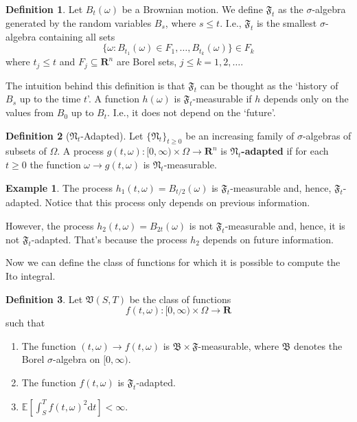 \documentclass[12pt,a4paper]{article}
\theoremstyle{definition}
\newtheorem{example}{Example}[section]
\newtheorem{definition}{Definition}[section]
\begin{document}
\begin{definition}
	Let $B_t(\omega)$ be a Brownian motion. We define $\mathfrak{F}_t$ as the $\sigma$-algebra generated by the random variables $B_s$, where $s \leq t$. I.e., $\mathfrak{F}_t$ is the smallest $\sigma$-algebra containing all sets
	\[
		\{ \omega : B_{t_1}(\omega) \in F_1, \ldots, B_{t_k}(\omega) \} \in F_k
	\]
	where $t_j \leq t$ and $F_j \subseteq \textbf{R}^n$ are Borel sets, $j \leq k = 1, 2, \ldots$.
\end{definition}

The intuition behind this definition is that $\mathfrak{F}_t$ can be thought as the `history of $B_s$ up to the time $t$'. A function $h(\omega)$ is $\mathfrak{F}_t$-measurable if $h$ depends only on the values from $B_0$ up to $B_t$. I.e., it does not depend on the `future'. 

\begin{definition}[$\mathfrak{N}_t$-Adapted]
	Let $\{ \mathfrak{N}_t \}_{t \geq 0}$ be an increasing family of $\sigma$-algebras of subsets of $\Omega$. A process $g(t,\omega) : [0, \infty) \times \Omega \longrightarrow \textbf{R}^n$ is \textbf{$\mathfrak{N}_t$-adapted} if for each $t \geq 0$ the function $\omega \longrightarrow g(t,\omega)$ is $\mathfrak{N}_t$-measurable.
\end{definition}

\begin{example}
	The process $h_1(t, \omega) = B_{t/2}(\omega)$ is $\mathfrak{F}_t$-measurable and, hence, $\mathfrak{F}_t$-adapted. Notice that this process only depends on previous information.
	
	However, the process $h_2(t, \omega) = B_{2t}(\omega)$ is not $\mathfrak{F}_t$-measurable and, hence, it is not $\mathfrak{F}_t$-adapted. That's because the process $h_2$ depends on future information.
\end{example}

%
%

Now we can define the class of functions for which it is possible to compute the Ito integral.

\begin{definition} \label{def:ito-integral}
	Let $\mathfrak{V}(S,T)$ be the class of functions
	\[
		f(t, \omega) : [0, \infty) \times \Omega \longrightarrow \textbf{R}
	\]
	such that
	\begin{enumerate}
		\item The function $(t, \omega) \longrightarrow f(t, \omega)$ is $\mathfrak{B} \times \mathfrak{F}$-measurable, where $\mathfrak{B}$ denotes the Borel $\sigma$-algebra on $[0, \infty)$.
		\item The function $f(t,\omega)$ is $\mathfrak{F}_t$-adapted.
		\item $\mathbb{E} \left[ \int_S^T f(t, \omega)^2 \mathrm{d}t \right] < \infty$.
	\end{enumerate}
\end{definition}
\end{document}
